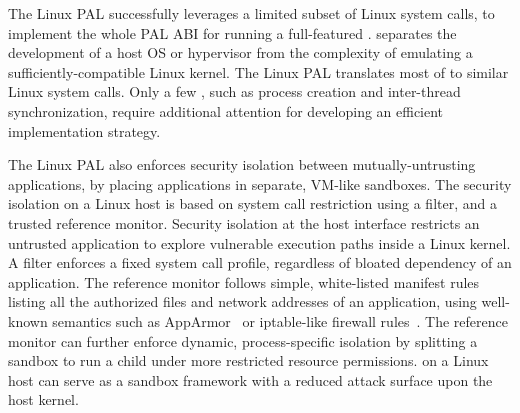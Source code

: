 


The Linux PAL successfully leverages a limited subset of Linux system calls,
to implement the whole PAL ABI for running a
full-featured \libos{}.
\Thehostabi{} separates the development of a host OS or hypervisor
from the complexity of emulating a sufficiently-compatible
Linux kernel.
The Linux PAL translates most of \thehostabi{}
to similar Linux system calls.
Only a few \hostapis{}, such as process creation and inter-thread synchronization, require additional attention for developing an efficient implementation strategy.



The Linux PAL also enforces security isolation
between mutually-untrusting applications,
by placing applications in separate, VM-like sandboxes.
The security isolation on a Linux host is based on system call restriction using a \seccomp{} filter, and a trusted reference monitor. %
Security isolation at the host interface
restricts an untrusted application to explore vulnerable execution paths
inside a Linux kernel.
A \seccomp{} filter 
enforces a fixed system call profile, regardless of bloated dependency of an application.
The reference monitor follows
simple, white-listed manifest rules listing 
all the authorized files and network addresses of an application,
using well-known semantics
such as AppArmor~\cite{apparmor} or iptable-like firewall rules~\cite{iptablesman}.
The reference monitor can further enforce dynamic, process-specific isolation by splitting a sandbox
to run a child \picoproc{} under more restricted
resource permissions.
\graphene{} on a Linux host can serve as a sandbox framework
with a reduced attack surface
upon the host kernel.






